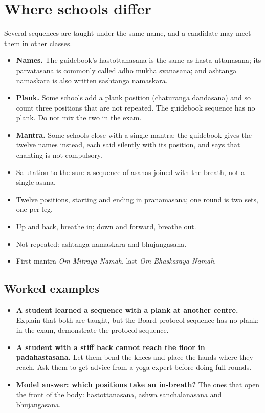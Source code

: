 \section{Where schools differ}

Several sequences are taught under the same name, and a candidate may meet them in other classes.
\begin{itemize}
\item \textbf{Names.} The guidebook's hastottanasana is the same as hasta uttanasana; its parvatasana is commonly called adho mukha svanasana; and ashtanga namaskara is also written sashtanga namaskara.
\item \textbf{Plank.} Some schools add a plank position (chaturanga dandasana) and so count three positions that are not repeated. The guidebook sequence has no plank. Do not mix the two in the exam.
\item \textbf{Mantra.} Some schools close with a single mantra; the guidebook gives the twelve names instead, each said silently with its position, and says that chanting is not compulsory.
\end{itemize}

\begin{recall}
\begin{itemize}
\item Salutation to the sun: a sequence of asanas joined with the breath, not a single asana.
\item Twelve positions, starting and ending in pranamasana; one round is two sets, one per leg.
\item Up and back, breathe in; down and forward, breathe out.
\item Not repeated: ashtanga namaskara and bhujangasana.
\item First mantra \emph{Om Mitraya Namah}, last \emph{Om Bhaskaraya Namah}.
\end{itemize}
\end{recall}

\subsection*{Worked examples}
\begin{itemize}
\item \textbf{A student learned a sequence with a plank at another centre.} Explain that both are taught, but the Board protocol sequence has no plank; in the exam, demonstrate the protocol sequence.
\item \textbf{A student with a stiff back cannot reach the floor in padahastasana.} Let them bend the knees and place the hands where they reach. Ask them to get advice from a yoga expert before doing full rounds.
\item \textbf{Model answer: which positions take an in-breath?} The ones that open the front of the body: hastottanasana, ashwa sanchalanasana and bhujangasana.
\end{itemize}

